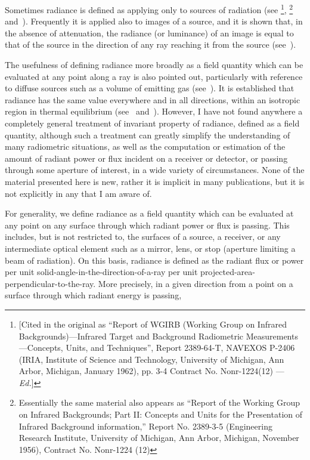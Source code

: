 Sometimes radiance is defined as applying only to sources of radiation
(see \footnote{[Cited in the original as ``Report of
WGIRB (Working Group on Infrared Backgrounds)---Infrared Target and Background
Radiometric Measurements---Concepts, Units, and Techniques'', Report 2389-64-T,
NAVEXOS P-2406 (IRIA, Institute of Science and Technology, University of
Michigan, Ann Arbor, Michigan, January 1962), pp. 3-4 Contract No. Nonr-1224(12)
---\textit{Ed.}]}, \footnote{Essentially the same
material also appears as “Report of the Working Group on Infrared Backgrounds;
Part II: Concepts and Units for the Presentation of Infrared Background
information,” Report No. 2389-3-5 (Engineering Research Institute, University of
Michigan, Ann Arbor, Michigan, November 1956), Contract No. Nonr-1224 (12)}
and~). Frequently it is applied also to images of a source,
and it is shown that, in the absence of attenuation, the radiance (or luminance)
of an image is equal to that of the source in the direction of any ray reaching
it from the source (see~).

The usefulness of defining radiance more broadly as a field quantity which can
be evaluated at any point along a ray is also pointed out, particularly with
reference to diffuse sources such as a volume of emitting gas
(see~).
It is established that radiance has the same value everywhere and in all
directions, within an isotropic region in thermal equilibrium
(see~ and~).
However, I have not found anywhere a completely general treatment of invariant
property of radiance, defined as a field quantity, although such a treatment can
greatly simplify the understanding of many radiometric situations, as well as
the computation or estimation of the amount of radiant power or flux incident on
a receiver or detector, or passing through some aperture of interest, in a wide
variety of circumstances. None of the material presented here is new, rather it
is implicit in many publications, but it is not explicitly in any that I am
aware of.

For generality, we define radiance as a field quantity which can be evaluated at
any point on any surface through which radiant power or flux is passing.
This includes, but is not restricted to, the surfaces of a source, a receiver,
or any intermediate optical element such as a mirror, lens, or stop (aperture
limiting a beam of radiation). On this basis, radiance is defined as the radiant
flux or power per unit solid-angle-in-the-direction-of-a-ray per unit
projected-area-perpendicular-to-the-ray.
More precisely, in a given direction from a point on a surface through which radiant
energy is passing,

